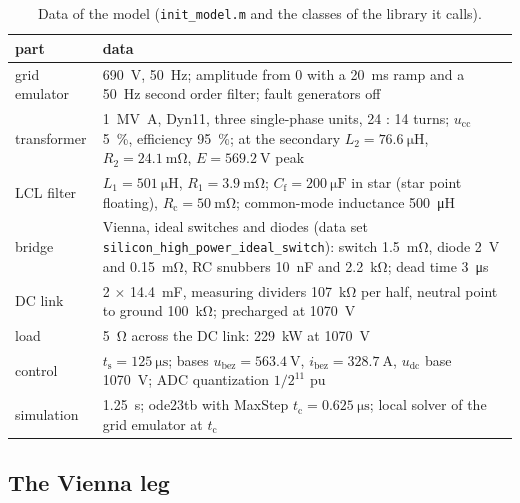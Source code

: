 \documentclass[11pt,a4paper]{scrartcl}
\newcommand{\ped}[1]{_{\mathrm{#1}}}
\newcommand{\code}[1]{\texttt{#1}}
\newcommand{\us}{\_\allowbreak}  %
\begin{document}
\begin{onehalfspace}
\begin{table}[H]
	\centering
	\caption{Data of the model (\code{init\_model.m} and the classes of the library it calls).}
	\label{tab:data}
	\footnotesize
	\begin{tabularx}{\textwidth}{@{} l X @{}}
		\toprule
		part & data \\
		\midrule
		grid emulator & \SI{690}{\volt}, \SI{50}{\hertz}; amplitude from 0 with a \SI{20}{\milli\second} ramp and a \SI{50}{\hertz} second order filter; fault generators off \\
		transformer & \SI{1}{\mega\volt\ampere}, Dyn11, three single-phase units, 24 : 14 turns; $u\ped{cc}$ 5~\%, efficiency 95~\%; at the secondary $L_2 = \SI{76.6}{\micro\henry}$, $R_2 = \SI{24.1}{\milli\ohm}$, $E = \SI{569.2}{\volt}$ peak \\
		LCL filter & $L_1 = \SI{501}{\micro\henry}$, $R_1 = \SI{3.9}{\milli\ohm}$; $C\ped{f} = \SI{200}{\micro\farad}$ in star (star point floating), $R\ped{c} = \SI{50}{\milli\ohm}$; common-mode inductance \SI{500}{\micro\henry} \\
		bridge & Vienna, ideal switches and diodes (data set \code{silicon\us high\us power\us ideal\us switch}): switch \SI{1.5}{\milli\ohm}, diode \SI{2}{\volt} and \SI{0.15}{\milli\ohm}, RC snubbers \SI{10}{\nano\farad} and \SI{2.2}{\kilo\ohm}; dead time \SI{3}{\micro\second} \\
		DC link & \num{2} $\times$ \SI{14.4}{\milli\farad}, measuring dividers \SI{107}{\kilo\ohm} per half, neutral point to ground \SI{100}{\kilo\ohm}; precharged at \SI{1070}{\volt} \\
		load & \SI{5}{\ohm} across the DC link: \SI{229}{\kilo\watt} at \SI{1070}{\volt} \\
		control & $t\ped{s} = \SI{125}{\micro\second}$; bases $u\ped{bez} = \SI{563.4}{\volt}$, $i\ped{bez} = \SI{328.7}{\ampere}$, $u\ped{dc}$ base \SI{1070}{\volt}; ADC quantization $1/2^{11}$ pu \\
		simulation & \SI{1.25}{\second}; ode23tb with MaxStep $t\ped{c} = \SI{0.625}{\micro\second}$; local solver of the grid emulator at $t\ped{c}$ \\
		\bottomrule
	\end{tabularx}
\end{table}

\subsection{The Vienna leg}
\label{sec:leg}


\end{onehalfspace}
\end{document}
